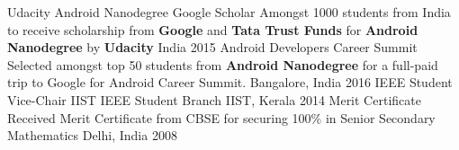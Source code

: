 \begin{cvhonors}
  \cvhonor
  	{Udacity Android Nanodegree Google Scholar}
    {Amongst 1000 students from India to receive scholarship from \textbf{Google} and \textbf{Tata Trust Funds} for \textbf{Android Nanodegree} by \textbf{Udacity}}
    {India}
    {2015}
   \cvhonor
   	{Android Developers Career Summit}
    {Selected amongst top 50 students from \textbf{Android Nanodegree} for a full-paid trip to Google for Android Career Summit.}
    {Bangalore, India}
    {2016}
   \cvhonor
   	{IEEE Student Vice-Chair}
    {IIST IEEE Student Branch}
    {IIST, Kerala}
   	{2014}
   \cvhonor
   	{Merit Certificate}
    {Received Merit Certificate from CBSE for securing 100\% in Senior Secondary Mathematics}
    {Delhi, India}
    {2008}
\end{cvhonors}
